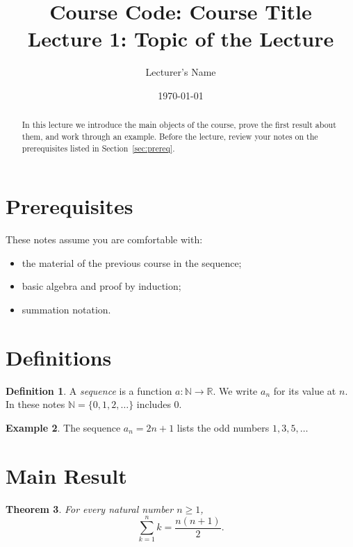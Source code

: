 \documentclass[11pt, a4paper]{article}
\title{Course Code: Course Title \\[0.5em] \large Lecture 1: Topic of the Lecture}
\author{Lecturer's Name}
\date{\today}
\theoremstyle{plain}
\newtheorem{theorem}{Theorem}[section]
\theoremstyle{definition}
\newtheorem{definition}[theorem]{Definition}
\newtheorem{example}[theorem]{Example}
\theoremstyle{remark}
\numberwithin{equation}{section}
\begin{document}
\maketitle

\begin{abstract}
In this lecture we introduce the main objects of the course, prove the
first result about them, and work through an example. Before the lecture,
review your notes on the prerequisites listed in Section~\ref{sec:prereq}.
\end{abstract}

\tableofcontents

\section{Prerequisites}
\label{sec:prereq}

These notes assume you are comfortable with:
\begin{itemize}
  \item the material of the previous course in the sequence;
  \item basic algebra and proof by induction;
  \item summation notation.
\end{itemize}

\section{Definitions}
\label{sec:defs}

\begin{definition}
\label{def:sequence}
A \emph{sequence} is a function $a \colon \mathbb{N} \to \mathbb{R}$. We
write $a_n$ for its value at $n$. In these notes
$\mathbb{N} = \{0, 1, 2, \dots\}$ includes $0$.
\end{definition}

\begin{example}
\label{ex:arith}
The sequence $a_n = 2n + 1$ lists the odd numbers $1, 3, 5, \dots$
\end{example}

\section{Main Result}
\label{sec:main}

\begin{theorem}
\label{thm:sum}
For every natural number $n \geq 1$,
\begin{equation}
  \sum_{k=1}^{n} k = \frac{n(n+1)}{2} .
  \label{eq:sum}
\end{equation}
\end{theorem}
\end{document}
